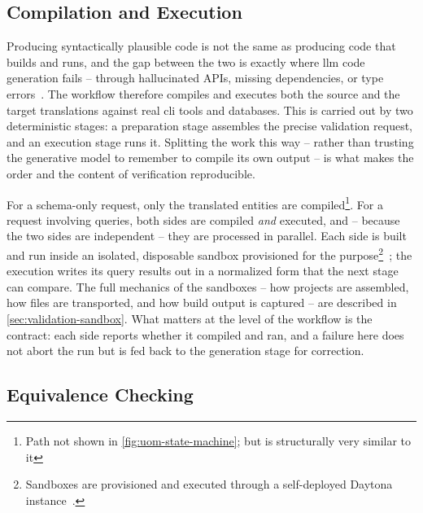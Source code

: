 \subsection{Compilation and Execution}
\label{sec:workflow-validate}

Producing syntactically plausible code is not the same as producing code that builds and runs, and the gap between the two is exactly where \acrshort{llm} code generation fails -- through hallucinated APIs, missing dependencies, or type errors~\cite{spracklenPackageHallucinations2025}. The workflow therefore compiles and executes both the source and the target translations against real \acrshort{cli} tools and databases. This is carried out by two deterministic stages: a preparation stage assembles the precise validation request, and an execution stage runs it. Splitting the work this way -- rather than trusting the generative model to remember to compile its own output -- is what makes the order and the content of verification reproducible.

For a schema-only request, only the translated entities are compiled\footnote{Path not shown in \cref{fig:uom-state-machine}; but is structurally very similar to it}. For a request involving queries, both sides are compiled \emph{and} executed, and -- because the two sides are independent -- they are processed in parallel. Each side is built and run inside an isolated, disposable sandbox provisioned for the purpose\footnote{Sandboxes are provisioned and executed through a self-deployed Daytona instance~\cite{daytona2026}.}~\cite{daytona2026}; the execution writes its query results out in a normalized form that the next stage can compare. The full mechanics of the sandboxes -- how projects are assembled, how files are transported, and how build output is captured -- are described in \cref{sec:validation-sandbox}. What matters at the level of the workflow is the contract: each side reports whether it compiled and ran, and a failure here does not abort the run but is fed back to the generation stage for correction.

\subsection{Equivalence Checking}
\label{sec:workflow-equivalence}

